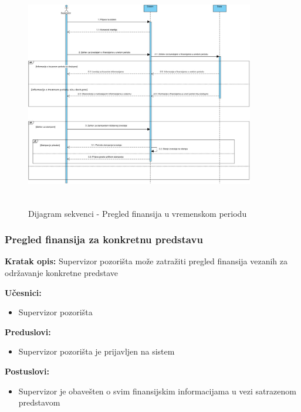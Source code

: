 \documentclass[a4paper]{article}
\begin{document}
\begin{figure}[H]
  \begin{center}
    \includegraphics[width=100mm,height=100mm]{../images/sequence_vodjenje_finansija_1.jpg}
  \end{center}
  \caption{Dijagram sekvenci - Pregled finansija u vremenskom periodu}
  \label{sekvence_vodjenje_finansija_vreme}
\end{figure}


\subsubsection{Pregled finansija za konkretnu predstavu}
\noindent\textbf{Kratak opis:} Supervizor pozorišta može zatražiti pregled finansija vezanih za održavanje konkretne predstave

\noindent\textbf{Učesnici:} 
\begin{itemize}
  \item Supervizor pozorišta
\end{itemize}

\noindent\textbf{Preduslovi:} 
\begin{itemize}
  \item Supervizor pozorišta je prijavljen na sistem
\end{itemize}

\noindent\textbf{Postuslovi:} 
\begin{itemize}
  \item Supervizor je obavešten o svim finansijskim informacijama u vezi satrazenom predstavom
\end{itemize}
\end{document}
